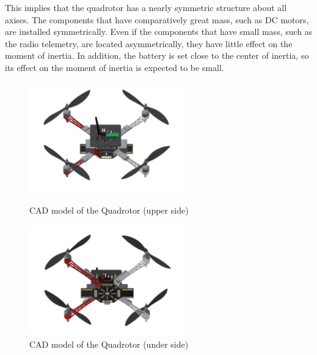 This implies that the quadrotor has a nearly symmetric structure about all axises. The components that have comparatively great mass, such as DC motors, are installed symmetrically. Even if the components that have small mass, such as the radio telemetry, are located asymmetrically, they have little effect on the moment of inertia. In addition, the battery is set close to the center of inertia, so its effect on the moment of inertia is expected to be small.

\begin{figure}
    \centering
    \includegraphics[width=0.6\textwidth]{graphics/cad_upper.png}
    \caption{CAD model of the Quadrotor (upper side)}
    \label{fig:cad_1}

\vspace{1cm}
    \centering
    \includegraphics[width=0.6\textwidth]{graphics/cad_under.png}
    \caption{CAD model of the Quadrotor (under side)}
    \label{fig:cad_2}
\end{figure}


